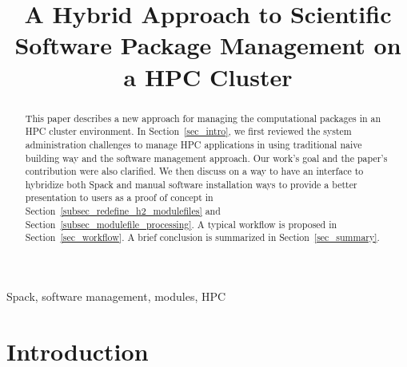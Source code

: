 \documentclass[conference]{IEEEtran}
\begin{document}
\title{A Hybrid Approach to Scientific Software Package Management on a HPC Cluster}

\author{
\and
{}
}

\maketitle

\begin{abstract}
This paper describes a new approach for managing the computational packages in an HPC cluster environment.
In Section~\ref{sec_intro}, we first reviewed the system administration challenges to manage HPC applications in using traditional naive building way and the software management approach. Our work's goal and the paper's contribution were also clarified.
We then discuss on a way to have an interface to hybridize both Spack and manual software installation ways to provide a better presentation to users as a proof of concept in Section~\ref{subsec_redefine_h2_modulefiles} and Section~\ref{subsec_modulefile_processing}. 
A typical workflow is proposed in Section~\ref{sec_workflow}.  
A brief conclusion is summarized in Section~\ref{sec_summary}.

\end{abstract}

\begin{IEEEkeywords}
Spack, software management, modules, HPC 
\end{IEEEkeywords}

\section{Introduction}\label{sec_intro}
\end{document}
